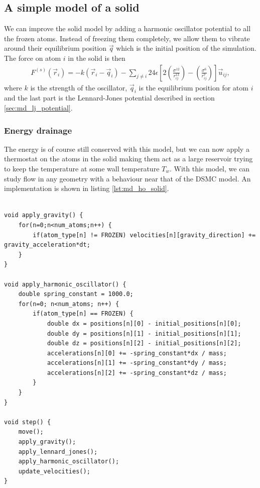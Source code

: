 \subsection{A simple model of a solid}
We can improve the solid model by adding a harmonic oscillator potential to all the frozen atoms. Instead of freezing them completely, we allow them to vibrate around their equilibrium position $\vec q$ which is the initial position of the simulation. The force on atom $i$ in the solid is then
\begin{align}
	F^{(s)}(\vec r_i) = -k(\vec r_i - \vec q_i) 
	- \sum_{j\neq i} 24\epsilon\left[2\left(\frac{\sigma^{12}}{r_{ij}^{13}}\right) - \left(\frac{\sigma^6}{r_{ij}^7}\right)\right]\vec u_{ij},
\end{align}
where $k$ is the strength of the oscillator, $\vec q_i$ is the equilibrium position for atom $i$ and the last part is the Lennard-Jones potential described in section \ref{sec:md_lj_potential}.\\
\subsubsection{Energy drainage}
The energy is of course still conserved with this model, but we can now apply a thermostat on the atoms in the solid making them act as a large reservoir trying to keep the temperature at some wall temperature $T_w$. With this model, we can study flow in any geometry with a behaviour near that of the DSMC model. An implementation is shown in listing \ref{lst:md_ho_solid}.

\begin{lstlisting}[caption=Implementation of the harmonic oscillator model of a solid., label=lst:md_ho_solid]

void apply_gravity() {
    for(n=0;n<num_atoms;n++) {
        if(atom_type[n] != FROZEN) velocities[n][gravity_direction] += gravity_acceleration*dt;
    }
}

void apply_harmonic_oscillator() {
    double spring_constant = 1000.0;
    for(n=0; n<num_atoms; n++) {
        if(atom_type[n] == FROZEN) {
            double dx = positions[n][0] - initial_positions[n][0];
            double dy = positions[n][1] - initial_positions[n][1];
            double dz = positions[n][2] - initial_positions[n][2];
            accelerations[n][0] += -spring_constant*dx / mass;
            accelerations[n][1] += -spring_constant*dy / mass;
            accelerations[n][2] += -spring_constant*dz / mass;
        }
    }
}

void step() {
    move();
    apply_gravity();
    apply_lennard_jones();
    apply_harmonic_oscillator();
    update_velocities();
}
\end{lstlisting}